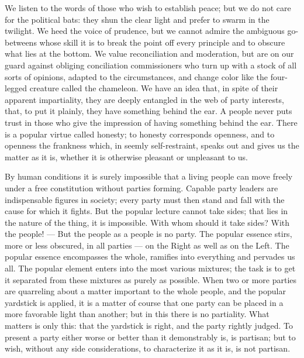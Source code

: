 \documentclass[12pt,a4paper,openany]{book}
\newcommand{\opage}[1]{\marginnote{\footnotesize\textit{[#1]}}}
\begin{document}
We listen to the words of those who wish to establish peace; but
we do not care for the political bats: they shun the
clear light and prefer to swarm in the twilight. We heed
the voice of prudence, but we cannot admire
the ambiguous go-betweens whose skill it is
to break the point off every principle and to obscure what
lies at the bottom. We value reconciliation and
moderation, but are on our guard against obliging
\setcounter{footnote}{0}%
\opage{3}conciliation commissioners who turn up with a stock of all sorts of
opinions, adapted to the circumstances,
and change color like the four-legged creature called the chameleon.
We have an idea that, in spite of their apparent
impartiality, they are deeply entangled in the web of
party interests, that, to put it plainly, they have something
behind the ear. A people never puts trust in those who
give the impression of having something behind the ear. There is a
popular virtue called honesty; to honesty corresponds
openness, and to openness the frankness which, in
seemly self-restraint, speaks out and
gives us the matter as it is, whether it is
otherwise pleasant or unpleasant to us.

By human conditions it is surely impossible that
a living people can move freely under a free constitution
without parties forming. Capable party leaders
are indispensable figures in society; every
party must then stand and fall with the cause for which
it fights. But the popular lecture cannot
take sides; that lies in the nature of the thing, it is impossible.
With whom should it take sides? With the people! ---
But the people as a people is no party. The popular
essence stirs, more or less obscured, in all
parties --- on the Right as well as on the Left. The
popular essence encompasses the whole, ramifies into
everything and pervades us all. The popular element
enters into the most various mixtures; the task
is to get it separated from these mixtures as purely
as possible. When two or more parties are quarreling about a
matter important to the whole people, and the popular yardstick
is applied, it is a matter of course that one party can
be placed in a more favorable light than another; but
\setcounter{footnote}{0}%
\opage{4}in this there is no partiality. What matters
is only this: that the yardstick is right, and the party
rightly judged. To present a party either worse or
better than it demonstrably is, is partisan; but to wish, without any
side considerations, to characterize it as it is, is
not partisan.
\end{document}
